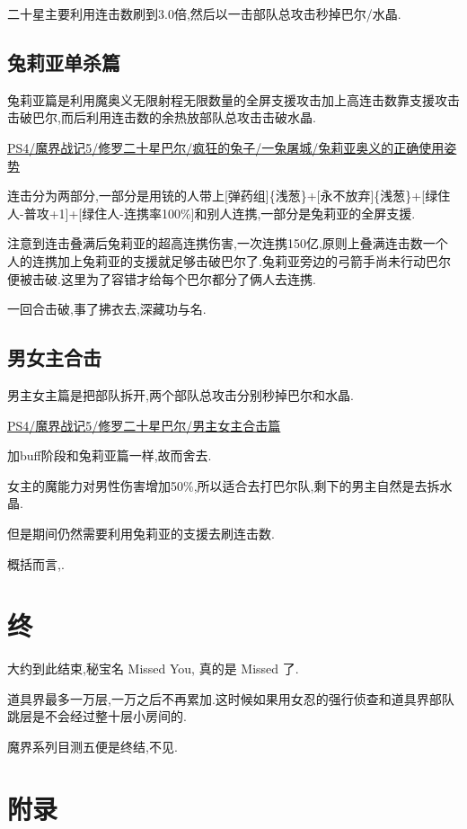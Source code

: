 	二十星主要利用连击数刷到3.0倍,然后以一击部队总攻击秒掉巴尔/水晶.

	\newpage

	\subsection{兔莉亚单杀篇}

	兔莉亚篇是利用魔奥义无限射程无限数量的全屏支援攻击加上高连击数靠支援攻击击破巴尔,而后利用连击数的余热放部队总攻击击破水晶.

	\href{http://www.bilibili.com/video/av2989748/}{PS4/魔界战记5/修罗二十星巴尔/疯狂的兔子/一兔屠城/兔莉亚奥义的正确使用姿势}


	连击分为两部分,一部分是用铳的人带上[弹药组]\{浅葱\}+[永不放弃]\{浅葱\}+[绿住人-普攻+1]+[绿住人-连携率100\%]和别人连携,一部分是兔莉亚的全屏支援.

	注意到连击叠满后兔莉亚的超高连携伤害,一次连携150亿,原则上叠满连击数一个人的连携加上兔莉亚的支援就足够击破巴尔了.兔莉亚旁边的弓箭手尚未行动巴尔便被击破.这里为了容错才给每个巴尔都分了俩人去连携.

	一回合击破,事了拂衣去,深藏功与名.

	\subsection{男女主合击}

	男主女主篇是把部队拆开,两个部队总攻击分别秒掉巴尔和水晶.
	
	\href{http://www.bilibili.com/video/av2995573/}{PS4/魔界战记5/修罗二十星巴尔/男主女主合击篇}

	加buff阶段和兔莉亚篇一样,故而舍去.

	女主的魔能力对男性伤害增加50\%,所以适合去打巴尔队,剩下的男主自然是去拆水晶.

	但是期间仍然需要利用兔莉亚的支援去刷连击数.

	概括而言,{\color{red}{二十星是利用连击+部队总攻击}}.


	\newpage
	\section{终}

	大约到此结束,秘宝名 Missed You, 真的是 Missed 了.

	道具界最多一万层,一万之后不再累加.这时候如果用女忍的强行侦查和道具界部队跳层是不会经过整十层小房间的.

	魔界系列目测五便是终结,不见.

	\newpage
	\section{附录}

